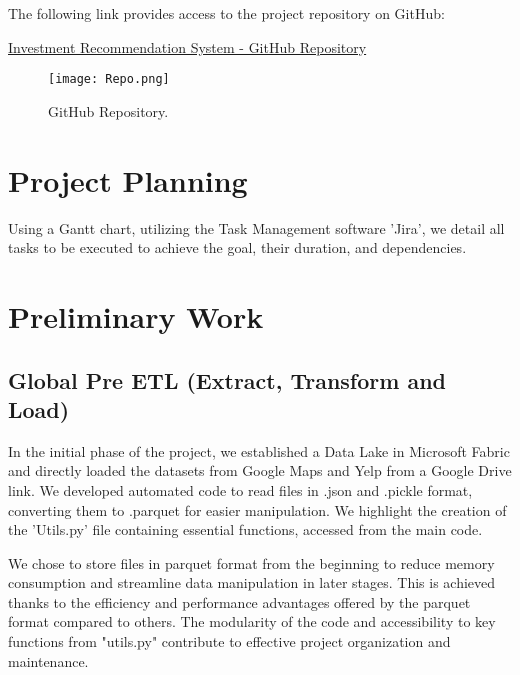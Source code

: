 \documentclass[12pt]{article}
\begin{document}
The following link provides access to the project repository on GitHub:

\href{https://github.com/leocortes85/Invesment_Recomendation_Project}{Investment Recommendation System - GitHub Repository}

\begin{figure}[H]
  \centering
  \texttt{[image: Repo.png]}
  \caption{GitHub Repository.}
  \label{fig:GitHub Repository}
\end{figure}

\section{Project Planning}

Using a Gantt chart, utilizing the Task Management software 'Jira', we detail all tasks to be executed to achieve the goal, their duration, and dependencies.


\section{Preliminary Work}
\subsection{Global Pre ETL (Extract, Transform and Load)}
In the initial phase of the project, we established a Data Lake in Microsoft Fabric and directly loaded the datasets from Google Maps and Yelp from a Google Drive link. We developed automated code to read files in .json and .pickle format, converting them to .parquet for easier manipulation. We highlight the creation of the 'Utils.py' file containing essential functions, accessed from the main code.

We chose to store files in parquet format from the beginning to reduce memory consumption and streamline data manipulation in later stages. This is achieved thanks to the efficiency and performance advantages offered by the parquet format compared to others. The modularity of the code and accessibility to key functions from "utils.py" contribute to effective project organization and maintenance.
\end{document}
